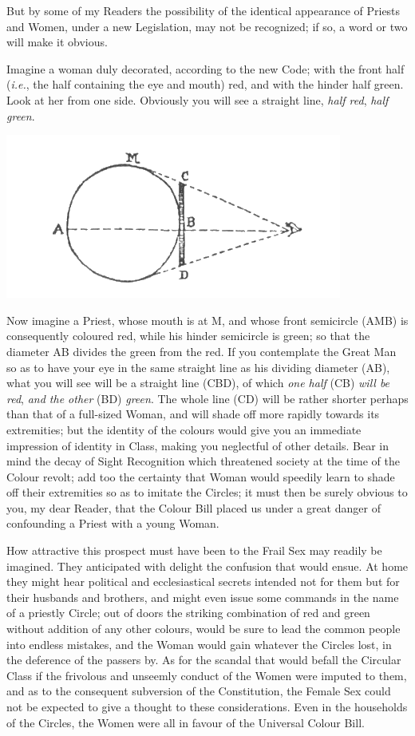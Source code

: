 \documentclass[10pt, kindle, oneside]{kindle}
\begin{document}
But by some of my Readers the possibility of the identical appearance of
Priests and Women, under a new Legislation, may not be recognized; if so, a
word or two will make it obvious.

Imagine a woman duly decorated, according to the new Code; with the front half
(\emph{i.e.}, the half containing the eye and mouth) red, and with the hinder half
green. Look at her from one side. Obviously you will see a straight line, \emph{half
red}, \emph{half green}. 
\begin{center}
    \includegraphics[trim=0mm 0mm 0mm 0mm, scale=0.5]{fig5}
\end{center}

Now imagine a Priest, whose mouth is at M, and whose front semicircle (AMB) is
consequently coloured red, while his hinder semicircle is green; so that the
diameter AB divides the green from the red. If you contemplate the Great Man
so as to have your eye in the same straight line as his dividing diameter
(AB), what you will see will be a straight line (CBD), of which \emph{one half} (CB)
\emph{will be red}, \emph{and the other} (BD) \emph{green}. The whole line (CD) will be rather
shorter perhaps than that of a full-sized Woman, and will shade off more
rapidly towards its extremities; but the identity of the colours would give
you an immediate impression of identity in Class, making you neglectful of
other details. Bear in mind the decay of Sight Recognition which threatened
society at the time of the Colour revolt; add too the certainty that Woman
would speedily learn to shade off their extremities so as to imitate the
Circles; it must then be surely obvious to you, my dear Reader, that the
Colour Bill placed us under a great danger of confounding a Priest with a
young Woman.

How attractive this prospect must have been to the Frail Sex may readily be
imagined. They anticipated with delight the confusion that would ensue. At
home they might hear political and ecclesiastical secrets intended not for
them but for their husbands and brothers, and might even issue some commands
in the name of a priestly Circle; out of doors the striking combination of red
and green without addition of any other colours, would be sure to lead the
common people into endless mistakes, and the Woman would gain whatever the
Circles lost, in the deference of the passers by. As for the scandal that
would befall the Circular Class if the frivolous and unseemly conduct of the
Women were imputed to them, and as to the consequent subversion of the
Constitution, the Female Sex could not be expected to give a thought to these
considerations. Even in the households of the Circles, the Women were all in
favour of the Universal Colour Bill.
\end{document}
